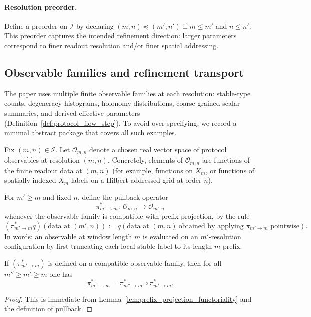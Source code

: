 \paragraph{Resolution preorder.}
Define a preorder on $\mathcal{I}$ by declaring
$(m,n)\preceq (m',n')$ if $m\le m'$ and $n\le n'$.
This preorder captures the intended refinement direction: larger parameters correspond to finer readout resolution and/or finer spatial addressing.

\subsection{Observable families and refinement transport}

The paper uses multiple finite observable families at each resolution: stable-type counts, degeneracy histograms, holonomy distributions, coarse-grained scalar summaries, and derived effective parameters (Definition~\ref{def:protocol_flow_step}).
To avoid over-specifying, we record a minimal abstract package that covers all such examples.

\begin{definition}\label{def:protocol_observable_space}
\MathTag Fix $(m,n)\in\mathcal{I}$.
Let $\mathcal{O}_{m,n}$ denote a chosen real vector space of protocol observables at resolution $(m,n)$.
Concretely, elements of $\mathcal{O}_{m,n}$ are functions of the finite readout data at $(m,n)$ (for example, functions on $X_m$, or functions of spatially indexed $X_m$-labels on a Hilbert-addressed grid at order $n$).
\end{definition}

\begin{definition}\label{def:window_uplift_pullback}
\MathTag For $m'\ge m$ and fixed $n$, define the pullback operator
\[
\pi_{m'\to m}^\ast:\ \mathcal{O}_{m,n}\to \mathcal{O}_{m',n}
\]
whenever the observable family is compatible with prefix projection, by the rule
\[
(\pi_{m'\to m}^\ast q)(\text{data at }(m',n)) := q(\text{data at }(m,n)\ \text{obtained by applying }\pi_{m'\to m}\text{ pointwise}).
\]
In words: an observable at window length $m$ is evaluated on an $m'$-resolution configuration by first truncating each local stable label to its length-$m$ prefix.
\end{definition}

\begin{lemma}\label{lem:window_pullback_functoriality}
\MathTag If $(\pi_{m'\to m}^\ast)$ is defined on a compatible observable family, then for all $m''\ge m'\ge m$ one has
\[
\pi_{m''\to m}^\ast=\pi_{m''\to m'}^\ast\circ \pi_{m'\to m}^\ast.
\]
\end{lemma}
\begin{proof}
This is immediate from Lemma~\ref{lem:prefix_projection_functoriality} and the definition of pullback.
\end{proof}

